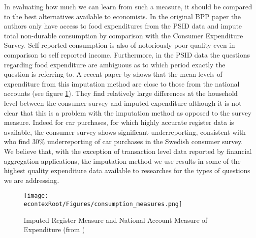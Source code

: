 \documentclass[titlepage]{\econtex}\newcommand{\texname}{ConsumptionHeterogeneity}
\begin{document}
In evaluating how much we can learn from such a measure, it should be compared to the best alternatives available to economists. In the original BPP paper the authors only have access to food expenditures from the PSID data and impute total non-durable consumption by comparison with the Consumer Expenditure Survey. Self reported consumption is also of notoriously poor quality even in comparison to self reported income. Furthermore, in the PSID data the questions regarding food expenditure are ambiguous as to which period exactly the question is referring to. A recent paper by \cite{abildgren_consistency_2018} shows that the mean levels of expenditure from this imputation method are close to those from the national accounts (see figure \ref{fig:ConsumptionMeasures}). They find relatively large differences at the household level between the consumer survey and imputed expenditure although it is not clear that this is a problem with the imputation method as opposed to the survey measure. Indeed for car purchases, for which highly accurate register data is available, the consumer survey shows significant underreporting, consistent with \cite{koijen_judging_2014} who find 30\% underreporting of car purchases in the Swedish consumer survey. We believe that, with the exception of transaction level data reported by financial aggregation applications, the imputation method we use results in some of the highest quality expenditure data available to researches for the types of questions we are addressing.
\begin{figure} 
	\begin{centering}
		\texttt{[image: \\econtexRoot/Figures/consumption\_measures.png]} 
		\caption{Imputed Register Measure and National Account Measure of Expenditure (from \cite{abildgren_consistency_2018})}
		\label{fig:ConsumptionMeasures}
	\end{centering}
\end{figure}
\end{document}
